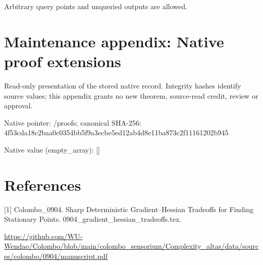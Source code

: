 \documentclass[10pt,a4paper]{article}
\begin{document}
Arbitrary query points and unqueried outputs are allowed.



\section{Maintenance appendix: Native proof extensions}


Read-only presentation of the stored native record. Integrity hashes identify source values; this appendix grants no new theorem, source-read credit, review or approval.



Native pointer: /proofs; canonical SHA-256: 4f53cda18c2baa0c0354bb5f\allowbreak{}9a3ecbe5ed12ab4d8e11ba87\allowbreak{}3c2f11161202b945



Native value (empty\_array): []



\section{References}


[1] Colombo\_0904. Sharp Deterministic Gradient--Hessian Tradeoffs for Finding Stationary Points. 0904\_gradient\_hessian\_tradeoffs.tex.



\url{https://github.com/WU-Wendao/Colombo/blob/main/colombo_sensorium/Complexity_altas/data/sources/colombo/0904/manuscript.pdf}
\end{document}
